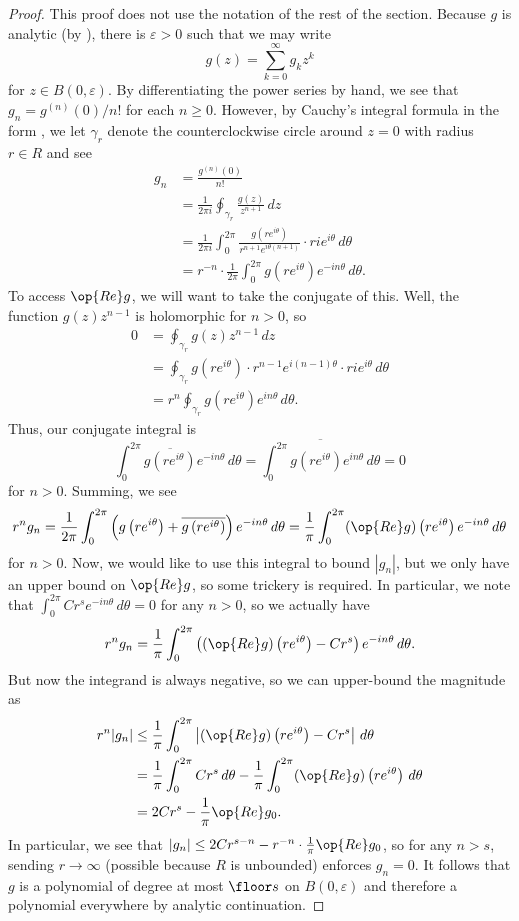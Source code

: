 \documentclass[notes.tex]{subfiles}
\begin{document}
\begin{proof}
	This proof does not use the notation of the rest of the section. Because $g$ is analytic (by ), there is $\varepsilon>0$ such that we may write
	\[g(z)=\sum_{k=0}^\infty g_kz^k\]
	for $z\in B(0,\varepsilon)$. By differentiating the power series by hand, we see that $g_n=g^{(n)}(0)/n!$ for each $n\ge0$. However, by Cauchy's integral formula in the form , we let $\gamma_r$ denote the counterclockwise circle around $z=0$ with radius $r\in R$ and see
	\begin{align*}
		g_n &= \frac{g^{(n)}(0)}{n!} \\
		&= \frac1{2\pi i}\oint_{\gamma_r}\frac{g(z)}{z^{n+1}}\,dz \\
		&= \frac1{2\pi i}\int_0^{2\pi}\frac{g\left(re^{i\theta}\right)}{r^{n+1}e^{i\theta(n+1)}}\cdot rie^{i\theta}\,d\theta \\
		&= r^{-n}\cdot\frac1{2\pi}\int_0^{2\pi}g\left(re^{i\theta}\right)e^{-in\theta}\,d\theta.
	\end{align*}
	To access $\op{Re}g$, we will want to take the conjugate of this. Well, the function $g(z)z^{n-1}$ is holomorphic for $n>0$, so
	\begin{align*}
		0 &= \oint_{\gamma_r}g(z)z^{n-1}\,dz \\
		&= \oint_{\gamma_r}g\left(re^{i\theta}\right)\cdot r^{n-1}e^{i(n-1)\theta}\cdot rie^{i\theta}\,d\theta \\
		&= r^n\oint_{\gamma_r}g\left(re^{i\theta}\right)e^{in\theta}\,d\theta.
	\end{align*}
	Thus, our conjugate integral is
	\[\int_0^{2\pi}\overline{g\left(re^{i\theta}\right)}e^{-in\theta}\,d\theta=\overline{\int_0^{2\pi}g\left(re^{i\theta}\right)e^{in\theta}\,d\theta}=0\]
	for $n>0$. Summing, we see
	\[r^ng_n=\frac1{2\pi}\int_0^{2\pi}\left(g\left(re^{i\theta}\right)+\overline{g\left(re^{i\theta}\right)}\right)e^{-in\theta}\,d\theta=\frac1\pi\int_0^{2\pi}(\op{Re}g)\left(re^{i\theta}\right)e^{-in\theta}\,d\theta\]
	for $n>0$. Now, we would like to use this integral to bound $|g_n|$, but we only have an upper bound on $\op{Re}g$, so some trickery is required. In particular, we note that $\int_0^{2\pi}Cr^se^{-in\theta}\,d\theta=0$ for any $n>0$, so we actually have
	\[r^ng_n=\frac1\pi\int_0^{2\pi}\left((\op{Re}g)\left(re^{i\theta}\right)-Cr^s\right)e^{-in\theta}\,d\theta.\]
	But now the integrand is always negative, so we can upper-bound the magnitude as
	\begin{align*}
		r^n|g_n| &\le \frac1\pi\int_0^{2\pi}\left|(\op{Re}g)\left(re^{i\theta}\right)-Cr^s\right|\,d\theta \\
		&= \frac1\pi\int_0^{2\pi}Cr^s\,d\theta-\frac1\pi\int_0^{2\pi}(\op{Re}g)\left(re^{i\theta}\right)\,d\theta \\
		&= 2Cr^s-\frac1\pi\op{Re}g_0.
	\end{align*}
	In particular, we see that $|g_n|\le2Cr^{s-n}-r^{-n}\cdot\frac1\pi\op{Re}g_0$, so for any $n>s$, sending $r\to\infty$ (possible because $R$ is unbounded) enforces $g_n=0$. It follows that $g$ is a polynomial of degree at most $\floor s$ on $B(0,\varepsilon)$ and therefore a polynomial everywhere by analytic continuation.
\end{proof}
\end{document}
